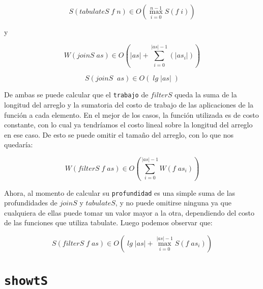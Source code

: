 \documentclass[a4paper,10pt]{article}
\begin{document}
\bigskip

\begin{equation*}
    S \left( tabulateS \;f \;n \right) \in
    O \left( \max_{i=0}^{n-1} S \left( f\; i \right) \right)
\end{equation*}

\smallskip
\begin{center}
y
\end{center}

\begin{equation*}
    W \left(joinS \;as\right) \in
    O \left( \vert as \vert + \sum_{i=0}^{\vert as \vert -1} \left( \vert as_i \vert \right) \right)
\end{equation*}

\begin{equation*}
    S \left(joinS\; \; as \right) \in
    O \left( \;lg \; \vert as \vert \; \right)
\end{equation*}


\bigskip
\bigskip

    De ambas se puede calcular que el \texttt{trabajo} de $filterS$ queda la
suma de la longitud del arreglo y la sumatoria del costo de trabajo de las
aplicaciones de la función a cada elemento. En el mejor de los casos, la función
utilizada es de costo constante, con lo cual ya tendríamos el costo lineal sobre
la longitud del arreglo en ese caso. De esto se puede omitir el tamaño del arreglo,
con lo que nos quedaría:
 
\begin{equation*}
    W \left(filterS \;f \;as \right) \in
    O \left( \sum_{i=0}^{\vert as \vert -1} W \left( f\; as_i \right) \right)
\end{equation*}

\bigskip

    Ahora, al momento de calcular su \texttt{profundidad} es una simple suma
de las profundidades de $joinS$ y $tabulateS$, y no puede omitirse ninguna ya
que cualquiera de ellas puede tomar un valor mayor a la otra, dependiendo del
costo de las funciones que utiliza tabulate. Luego podemos observar que:

\begin{equation*}
    S \left( filterS \;f \;as \right) \in
    O \left( \;lg \; \vert as \vert + \max_{i=0}^{\vert as \vert -1} S \left( f\; as_i \right) \right)
\end{equation*}


\bigskip


\section*{\texttt{showtS}}
\end{document}
